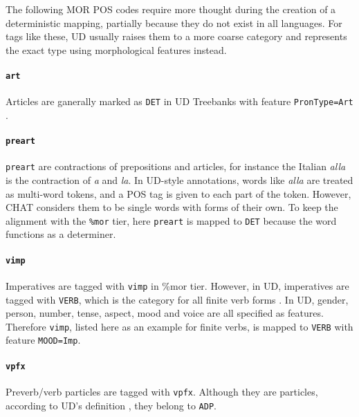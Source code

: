The following MOR POS codes require more thought during the creation of a deterministic mapping, partially because they do not exist in all languages. For tags like these, UD usually raises them to a more coarse category and represents the exact type using morphological features instead.

\paragraph{\texttt{art}}
Articles are ganerally marked as \texttt{DET} in UD Treebanks with feature \texttt{PronType=Art} .

\paragraph{\texttt{preart}}
\texttt{preart} are contractions of prepositions and articles, for instance the Italian \emph{alla} is the contraction of \emph{a} and \emph{la}. In UD-style annotations, words like \emph{alla} are treated as multi-word tokens, and a POS tag is given to each part of the token. However, CHAT considers them to be single words with forms of their own. To keep the alignment with the \texttt{\%mor} tier, here \texttt{preart} is mapped to \texttt{DET} because the word functions as a determiner.

\paragraph{\texttt{vimp}}
Imperatives are tagged with \texttt{vimp} in \%mor tier. However, in UD, imperatives are tagged with \texttt{VERB}, which is the category for all finite verb forms  . In UD, gender, person, number, tense, aspect, mood and voice are all specified as features. Therefore \texttt{vimp}, listed here as an example for finite verbs, is mapped to \texttt{VERB} with feature \texttt{MOOD=Imp}.

\paragraph{\texttt{vpfx}}
Preverb/verb particles are tagged with \texttt{vpfx}. Although they are particles, according to UD's definition , they belong to \texttt{ADP}.

